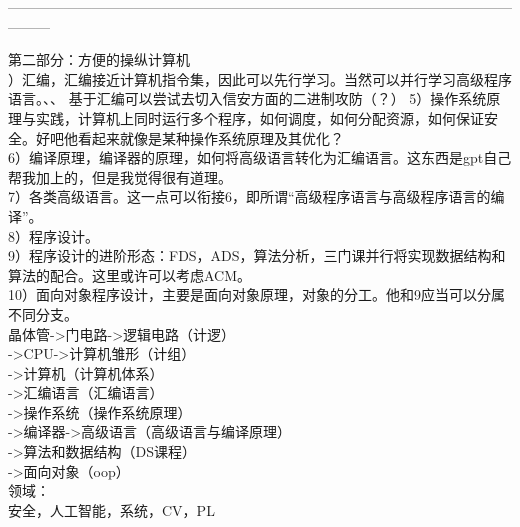 \documentclass{article}
\begin{document}
\begin{center}
    ———————————————————————————————————————
\end{center}
第二部分：方便的操纵计算机\\

）汇编，汇编接近计算机指令集，因此可以先行学习。当然可以并行学习高级程序语言。、、
基于汇编可以尝试去切入信安方面的二进制攻防（？）
5）操作系统原理与实践，计算机上同时运行多个程序，如何调度，如何分配资源，如何保证安全。好吧他看起来就像是某种操作系统原理及其优化？\\
6）编译原理，编译器的原理，如何将高级语言转化为汇编语言。这东西是gpt自己帮我加上的，但是我觉得很有道理。\\
7）各类高级语言。这一点可以衔接6，即所谓“高级程序语言与高级程序语言的编译”。\\
8）程序设计。\\
9）程序设计的进阶形态：FDS，ADS，算法分析，三门课并行将实现数据结构和算法的配合。这里或许可以考虑ACM。\\
10）面向对象程序设计，主要是面向对象原理，对象的分工。他和9应当可以分属不同分支。\\

\noindent
晶体管->门电路->逻辑电路（计逻）\\
->CPU->计算机雏形（计组）\\
->计算机（计算机体系）\\

\noindent
->汇编语言（汇编语言）\\
->操作系统（操作系统原理）\\
->编译器->高级语言（高级语言与编译原理）\\
->算法和数据结构（DS课程）\\
->面向对象（oop）\\

\noindent
领域：\\
安全，人工智能，系统，CV，PL\\
\end{document}
